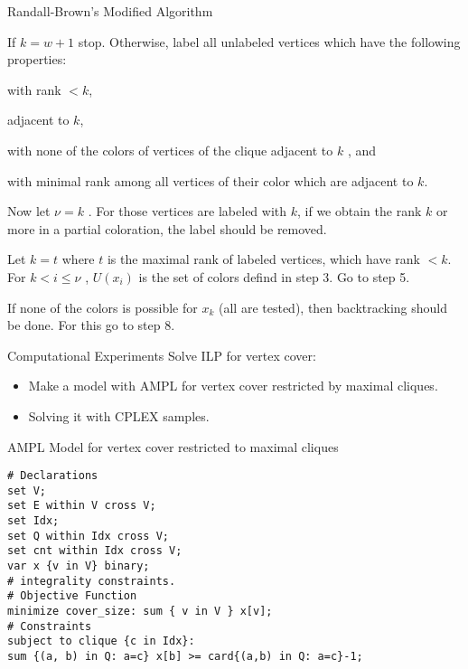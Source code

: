 \documentclass{beamer}
\begin{document}
\begin{frame}{Randall-Brown's Modified Algorithm}
\begin{enumerate}
{\item  If $k = w + 1$ stop. Otherwise, label all unlabeled vertices which have the
following properties:
\begin{enumerate}[(i)]
{\tiny \item with rank $< k$,

\item adjacent to $k$,

\item with none of the colors of vertices of the clique adjacent to $k$ , and
\item with minimal rank among all vertices of their color which are adjacent
to $k$.}
\end{enumerate}
Now let $\nu = k$ . For those vertices are labeled with $k$, if we obtain the rank
$k$ or more in a partial coloration, the label should be removed.\\


\item  Let $k = t$ where $t$ is the maximal rank of labeled vertices, which have rank $< k$. For $k < i \leq \nu$ , $U(x_i)$ is the set of colors defind in step 3. Go to step 5.\\


\item  If none of the colors is possible for $x_k$ (all are tested), then backtracking
should be done. For this go to step 8.\\}
\end{enumerate}

\end{frame}

\begin{frame}{Computational Experiments}
Solve ILP for vertex cover:
\begin{itemize}
\item Make a model with AMPL for vertex cover restricted by maximal cliques.
\item Solving it with CPLEX samples.
\end{itemize}
\end{frame}

\begin{frame}[fragile]{AMPL Model for vertex cover restricted to maximal cliques}


\begin{verbatim}
# Declarations
set V;
set E within V cross V;
set Idx;
set Q within Idx cross V;
set cnt within Idx cross V;
var x {v in V} binary;
# integrality constraints.
# Objective Function
minimize cover_size: sum { v in V } x[v];
# Constraints
subject to clique {c in Idx}:
sum {(a, b) in Q: a=c} x[b] >= card{(a,b) in Q: a=c}-1;
\end{verbatim}

\end{frame}
\end{document}
